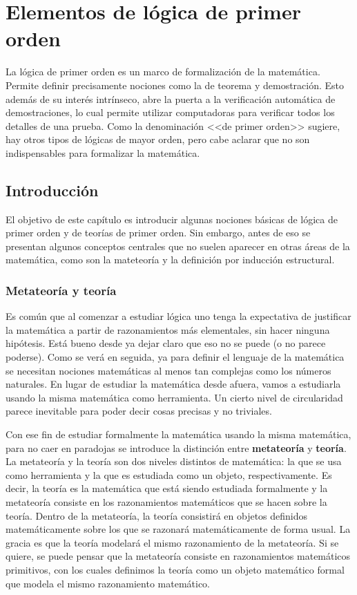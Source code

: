 \documentclass[a4paper, 12pt]{report}
\theoremstyle{definition}
\begin{document}
\tableofcontents

\chapter{Elementos de lógica de primer orden}

La lógica de primer orden es un marco de formalización de la matemática. Permite definir precisamente nociones como la de teorema y demostración. Esto además de su interés intrínseco, abre la puerta a la verificación automática de demostraciones, lo cual permite utilizar computadoras para verificar todos los detalles de una prueba. Como la denominación <<de primer orden>> sugiere, hay otros tipos de lógicas de mayor orden, pero cabe aclarar que no son indispensables para formalizar la matemática.

\section{Introducción}

El objetivo de este capítulo es introducir algunas nociones básicas de lógica de primer orden y de teorías de primer orden. Sin embargo, antes de eso se presentan algunos conceptos centrales que no suelen aparecer en otras áreas de la matemática, como son la mateteoría y la definición por inducción estructural.

\subsection{Metateoría y teoría}

Es común que al comenzar a estudiar lógica uno tenga la expectativa de justificar la matemática a partir de razonamientos más elementales, sin hacer ninguna hipótesis. Está bueno desde ya dejar claro que eso no se puede (o no parece poderse). Como se verá en seguida, ya para definir el lenguaje de la matemática se necesitan nociones matemáticas al menos tan complejas como los números naturales. En lugar de estudiar la matemática desde afuera, vamos a estudiarla usando la misma matemática como herramienta. Un cierto nivel de circularidad parece inevitable para poder decir cosas precisas y no triviales.

Con ese fin de estudiar formalmente la matemática usando la misma matemática, para no caer en paradojas se introduce la distinción entre \textbf{metateoría} y \textbf{teoría}. La metateoría y la teoría son dos niveles distintos de matemática: la que se usa como herramienta y la que es estudiada como un objeto, respectivamente. Es decir, la teoría es la matemática que está siendo estudiada formalmente y la metateoría consiste en los razonamientos matemáticos que se hacen sobre la teoría. Dentro de la metateoría, la teoría consistirá en objetos definidos matemáticamente sobre los que se razonará matemáticamente de forma usual. La gracia es que la teoría modelará el mismo razonamiento de la metateoría. Si se quiere, se puede pensar que la metateoría consiste en razonamientos matemáticos primitivos, con los cuales definimos la teoría como un objeto matemático formal que modela el mismo razonamiento matemático.
\end{document}
